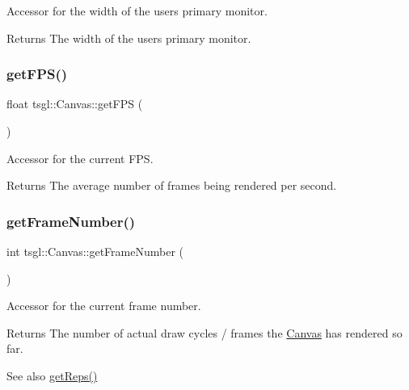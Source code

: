 Accessor for the width of the user\textquotesingle{}s primary monitor. 

\begin{DoxyReturn}{Returns}
The width of the user\textquotesingle{}s primary monitor. 
\end{DoxyReturn}
\mbox{\label{classtsgl_1_1_canvas_a1c8ac321138948650a3006f325dfb886}} 
\subsubsection{\texorpdfstring{get\+F\+P\+S()}{getFPS()}}
{\footnotesize\ttfamily float tsgl\+::\+Canvas\+::get\+F\+PS (\begin{DoxyParamCaption}{ }\end{DoxyParamCaption})}



Accessor for the current F\+PS. 

\begin{DoxyReturn}{Returns}
The average number of frames being rendered per second. 
\end{DoxyReturn}
\mbox{\label{classtsgl_1_1_canvas_af4f8f2b1abd27316a4a39ae097407d37}} 
\subsubsection{\texorpdfstring{get\+Frame\+Number()}{getFrameNumber()}}
{\footnotesize\ttfamily int tsgl\+::\+Canvas\+::get\+Frame\+Number (\begin{DoxyParamCaption}{ }\end{DoxyParamCaption})}



Accessor for the current frame number. 

\begin{DoxyReturn}{Returns}
The number of actual draw cycles / frames the \hyperlink{classtsgl_1_1_canvas}{Canvas} has rendered so far. 
\end{DoxyReturn}
\begin{DoxySeeAlso}{See also}
\hyperlink{classtsgl_1_1_canvas_a7340a669569360e83a4b431dea91d400}{get\+Reps()} 
\end{DoxySeeAlso}


